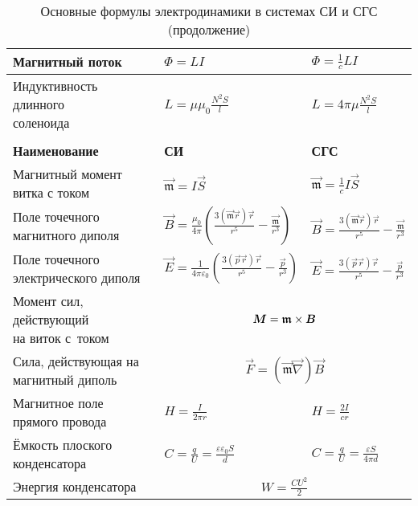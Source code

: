 \begin{longtable}{p{40mm}p{30mm}p{30mm}}
Магнитный поток		
        & $\Phi=LI$	&    $\Phi=\frac{1}{c}LI$	\bigstrut\\ \hline
\parbox{40mm}{Индуктивность длинного\\[-2.5pt] соленоида}
        & $L=\mu\mu_0\frac{N^2S}{l}$    &   $L=4\pi\mu \frac{N^2S}{l}$	\bigstrut\\ \hline
\newpage
\caption[]{Основные формулы электродинамики в системах СИ и СГС (продолжение)}  \\ 
\toprule[1pt]
\textbf{Наименование} & \textbf{СИ} & \textbf{СГС} \\ 
\midrule[1pt]
\parbox{40mm}{Магнитный момент\\[-2.5pt] витка с током}				 
        & $\vec{\mathfrak{m}  }=I\vec{S}$		&   $\vec{\mathfrak{m}  }=\frac{1}{c}I\vec{S}$	\bigstrut\\ \hline
\parbox{40mm}{Поле точечного\\[-2.5pt] магнитного диполя}
        & $\vec{B}=\frac{\mu_0}{4\pi}\!\left(\!\frac{3(\vec{\mathfrak{m}}\vec{r})\vec{r}}{r^5}-\frac{\vec{\mathfrak{m}}}{r^3}\!\right)$	
        & $\vec{B}=\frac{3(\vec{\mathfrak{m}}\vec{r})\vec{r}}{r^5}-\frac{\vec{\mathfrak{m}}}{r^3}$ \bigstrut\\ \hline
\parbox{40mm}{Поле точечного\\[-2.5pt] электрического диполя}
        & $\vec{E}=\frac{1}{4\pi\varepsilon_0}\!\left(\!\frac{3(\vec{p}\vec{r})\vec{r}}{r^5}-\frac{\vec{p}}{r^3}\!\right)$
        & $\vec{E}=\frac{3(\vec{p}\vec{r})\vec{r}}{r^5}-\frac{\vec{p}}{r^3}$ \bigstrut\\ \hline
\parbox{40mm}{Момент сил, действующий\\[-2.5pt] на виток с~током}
        & \bigstrut\\ \hline
\parbox{40mm}{Сила, действующая на\\[-2.5pt] магнитный диполь}
        &  \bigstrut\\ \hline
\parbox{40mm}{Магнитное поле\\[-2.pt] прямого провода} 
    & $H = \frac{I}{2\pi r}$ & $H=\frac{2I}{cr}$ \bigstrut \\ \hline         
\parbox{40mm}{Ёмкость плоского\\[-2.5pt] конденсатора}
        & $C=\frac{q}{U}=\frac{\varepsilon\varepsilon_0S}{d}$
        & $C=\frac{q}{U}=\frac{\varepsilon S}{4\pi d}$ \bigstrut \\ \hline
Энергия конденсатора
        &  \bigstrut\\
\bottomrule[1pt]
\end{longtable}
\endgroup

